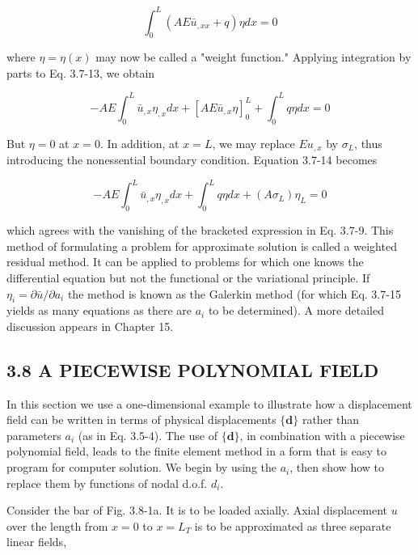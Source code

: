 \documentclass[10pt]{article}
\begin{document}
\begin{equation*}
\int_{0}^{L}\left(A E \bar{u}_{, x x}+q\right) \eta d x=0 \tag{3.7-13}
\end{equation*}

where $\eta=\eta(x)$ may now be called a "weight function." Applying integration by parts to Eq. 3.7-13, we obtain

\begin{equation*}
-A E \int_{0}^{L} \bar{u}_{, x} \eta_{, x} d x+[A E \bar{u}_{, x} \eta]_{0}^{L}+\int_{0}^{L} q \eta d x=0 \tag{3.7-14}
\end{equation*}

But $\eta=0$ at $x=0$. In addition, at $x=L$, we may replace $E u_{, x}$ by $\sigma_{L}$, thus introducing the nonessential boundary condition. Equation 3.7-14 becomes

\begin{equation*}
-A E \int_{0}^{L} \bar{u}_{, x} \eta_{, x} d x+\int_{0}^{L} q \eta d x+\left(A \sigma_{L}\right) \eta_{L}=0 \tag{3.7-15}
\end{equation*}

which agrees with the vanishing of the bracketed expression in Eq. 3.7-9. This method of formulating a problem for approximate solution is called a weighted residual method. It can be applied to problems for which one knows the differential equation but not the functional or the variational principle. If $\eta_{i}=\partial \bar{u} / \partial a_{i}$ the method is known as the Galerkin method (for which Eq. 3.7-15 yields as many
equations as there are $a_{i}$ to be determined). A more detailed discussion appears in Chapter 15.

\subsection*{3.8 A PIECEWISE POLYNOMIAL FIELD}
In this section we use a one-dimensional example to illustrate how a displacement field can be written in terms of physical displacements $\{\mathbf{d}\}$ rather than parameters $a_{i}$ (as in Eq. 3.5-4). The use of $\{\mathbf{d}\}$, in combination with a piecewise polynomial field, leads to the finite element method in a form that is easy to program for computer solution. We begin by using the $a_{i}$, then show how to replace them by functions of nodal d.o.f. $d_{i}$.

Consider the bar of Fig. 3.8-1a. It is to be loaded axially. Axial displacement $u$ over the length from $x=0$ to $x=L_{T}$ is to be approximated as three separate linear fields,
\end{document}
